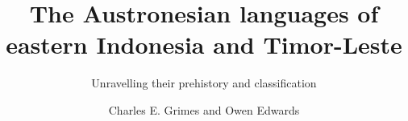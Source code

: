 \author{Charles E. Grimes and Owen Edwards}
\title{The Austronesian languages of eastern Indonesia and Timor-Leste}
\subtitle{Unravelling their prehistory and classification}
\renewcommand{\lsSeries}{lngr}
\renewcommand{\lsSeriesNumber}{1}
\renewcommand{\lsID}{526}
\renewcommand{\lsISBNhardcover}{978-3-96110-558-8}
\renewcommand{\lsISBNdigital}{978-3-98554-178-2}


